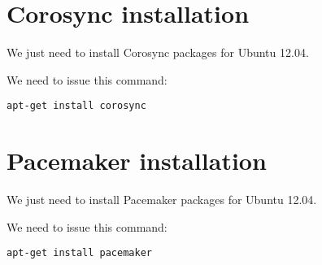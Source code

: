 \section {Corosync installation}
We just need to install Corosync packages for Ubuntu 12.04.

We need to issue this command:
\begin{verbatim}
apt-get install corosync
\end{verbatim}


\section {Pacemaker installation}
We just need to install Pacemaker packages for Ubuntu 12.04.

We need to issue this command:
\begin{verbatim}
apt-get install pacemaker
\end{verbatim}
